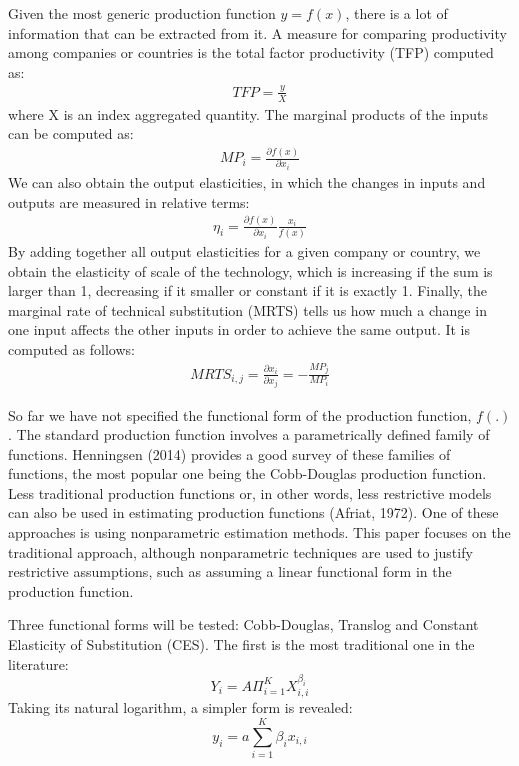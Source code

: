 \documentclass[12pt,a4paper]{article}\usepackage[]{graphicx}\usepackage[]{color}
\begin{document}
Given the most generic production function $y = f(x)$, there is a lot of information that can be extracted from it. A measure for comparing productivity among companies or countries is the total factor productivity (TFP) computed as:
\begin{align*}
TFP = \frac{y}{X}
\end{align*}
where X is an index aggregated quantity. The marginal products of the inputs can be computed as:
\begin{align*}
MP_i = \frac{\partial f(x)}{\partial x_i}
\end{align*}
We can also obtain the output elasticities, in which the changes in inputs and outputs are measured in relative terms:
\begin{align*}
\eta_i =  \frac{\partial f(x)}{\partial x_i} \frac{x_i}{f(x)}
\end{align*}
By adding together all output elasticities for a given company or country, we obtain the elasticity of scale of the technology, which is increasing if the sum is larger than 1, decreasing if it smaller or constant if it is exactly 1.
Finally, the marginal rate of technical substitution (MRTS) tells us how much a change in one input affects the other inputs in order to achieve the same output. It is computed as follows:
\begin{align*}
MRTS_{i,j} =  \frac{\partial x_i}{\partial x_j} = - \frac{MP_j}{MP_i}
\end{align*}

So far we have not specified the functional form of the production function, $f(.)$. The standard production function involves a parametrically defined family of functions. Henningsen (2014) provides a good survey of these families of functions, the most popular one being the Cobb-Douglas production function. Less traditional production functions or, in other words, less restrictive models can also be used in estimating production functions (Afriat, 1972). One of these approaches is using nonparametric estimation methods. This paper focuses on the traditional approach, although nonparametric techniques are used to justify restrictive assumptions, such as assuming a linear functional form in the production function.

Three functional forms will be tested: Cobb-Douglas, Translog and Constant Elasticity of Substitution (CES). The first is the most traditional one in the literature: 
\[ Y_i = A \Pi_{i=1}^K X_{i, i}^{\beta_i} \]
Taking its natural logarithm, a simpler form is revealed:
\[ y_i = a \sum_{i=1}^K \beta_i x_{i, i} \]
\end{document}
